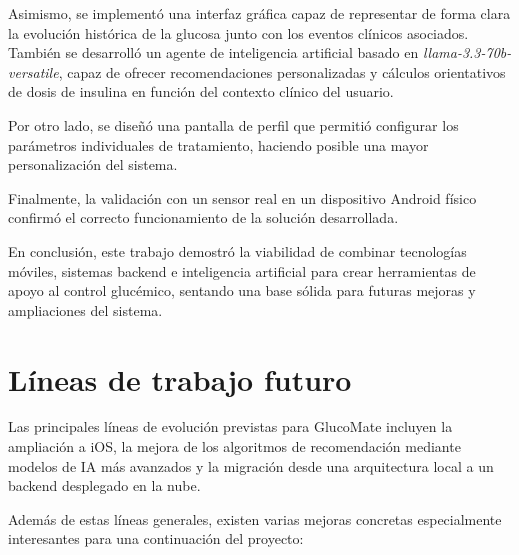 Asimismo, se implementó una interfaz gráfica capaz de representar de forma clara la evolución histórica de la glucosa junto con los eventos clínicos asociados. También se desarrolló un agente de inteligencia artificial basado en \textit{llama-3.3-70b-versatile}, capaz de ofrecer recomendaciones personalizadas y cálculos orientativos de dosis de insulina en función del contexto clínico del usuario.

Por otro lado, se diseñó una pantalla de perfil que permitió configurar los parámetros individuales de tratamiento, haciendo posible una mayor personalización del sistema.

Finalmente, la validación con un sensor real en un dispositivo Android físico confirmó el correcto funcionamiento de la solución desarrollada.

En conclusión, este trabajo demostró la viabilidad de combinar tecnologías móviles, sistemas backend e inteligencia artificial para crear herramientas de apoyo al control glucémico, sentando una base sólida para futuras mejoras y ampliaciones del sistema.
\section{Líneas de trabajo futuro}

Las principales líneas de evolución previstas para GlucoMate incluyen la ampliación a
iOS, la mejora de los algoritmos de recomendación mediante modelos de IA más avanzados y
la migración desde una arquitectura local a un backend desplegado en la nube.

Además de estas líneas generales, existen varias mejoras concretas especialmente
interesantes para una continuación del proyecto:

